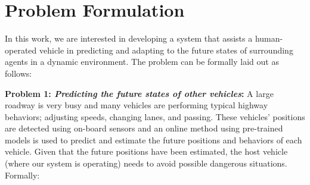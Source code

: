 \documentclass[conference]{IEEEtran}
\begin{document}
    
    
    
    
    
\section{Problem Formulation}
 
    In this work, we are interested in developing a system that assists a human-operated vehicle in predicting and adapting to the future states of surrounding agents in a dynamic environment. The problem can be formally laid out as follows:
    
    \textbf{Problem 1: \textit{Predicting the future states of other vehicles}:}
	A large roadway is very busy and many vehicles are performing typical highway behaviors; adjusting speeds, changing lanes, and passing. These vehicles' positions are detected using on-board sensors and an online method using pre-trained models is used to predict and estimate the future positions and behaviors of each vehicle. Given that the future positions have been estimated, the host vehicle (where our system is operating) needs to avoid possible dangerous situations. Formally:
	
\end{document}
